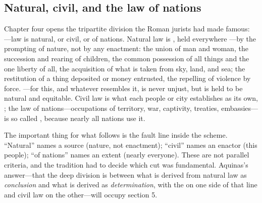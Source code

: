 \subsection{Natural, civil, and the law of nations}

Chapter four opens the tripartite division the Roman jurists had made famous: ---law is natural, or civil, or of nations. Natural law is , held everywhere ---by the prompting of nature, not by any enactment: the union of man and woman, the succession and rearing of children, the common possession of all things and the one liberty of all, the acquisition of what is taken from sky, land, and sea; the restitution of a thing deposited or money entrusted, the repelling of violence by force. ---for this, and whatever resembles it, is never unjust, but is held to be natural and equitable. Civil law is what each people or city establishes as its own, ; the law of nations---occupations of territory, war, captivity, treaties, embassies---is so called , because nearly all nations use it.

The important thing for what follows is the fault line inside the scheme. ``Natural'' names a source (nature, not enactment); ``civil'' names an enactor (this people); ``of nations'' names an extent (nearly everyone). These are not parallel criteria, and the tradition had to decide which cut was fundamental. Aquinas's answer---that the deep division is between what is derived from natural law as \emph{conclusion} and what is derived as \emph{determination}, with the  on one side of that line and civil law on the other---will occupy section 5.

